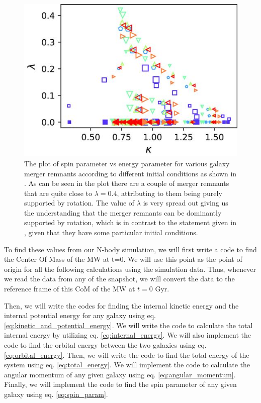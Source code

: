 \documentclass[twocolumn]{aastex631}
\begin{document}
\begin{figure}[htbp]
\includegraphics[width=.5\textwidth]{rotation_vs_dispersion.jpeg}
\caption{The plot of spin parameter vs energy parameter for various galaxy merger remnants according to different initial conditions as shown in \cite{same_mass_merger_1}. As can be seen in the plot there are a couple of merger remnants that are quite close to $\lambda=0.4$, attributing to them being purely supported by rotation. The value of $\lambda$ is very spread out giving us the understanding that the merger remnants can be dominantly supported by rotation, which is in contrast to the statement given in \cite{spin_param_explain}, given that they have some particular initial conditions. \label{fig:spin_vs_energy}}
\end{figure}

To find these values from our N-body simulation, we will first write a code to find the Center Of Mass of the MW at t=0. We will use this point as the point of origin for all the following calculations using the simulation data. Thus, whenever we read the data from any of the snapshot, we will convert the data to the reference frame of this CoM of the MW at $t=0$ Gyr. 

Then, we will write the codes for finding the internal kinetic energy and the internal potential energy for any galaxy using eq. \ref{eq:kinetic_and_potential_energy}. We will write the code to calculate the total internal energy by utilizing eq. \ref{eq:internal_energy}.
We will also implement the code to find the orbital energy between the two galaxies using eq. \ref{eq:orbital_energy}. Then, we will write the code to find the total energy of the system using eq. \ref{eq:total_energy}. We will implement the code to calculate the angular momentum of any given galaxy using eq. \ref{eq:angular_momentum}. Finally, we will implement the code to find the spin parameter of any given galaxy using eq. \ref{eq:spin_param}.  
\end{document}
